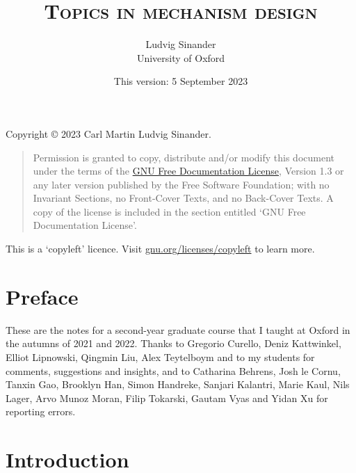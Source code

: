 \documentclass[11pt,letterpaper,reqno,oneside]{book}
\title{\scshape Topics in mechanism design}
\author{Ludvig Sinander \\
University of Oxford}
\date{\small This version: 5 September 2023}
\begin{document}
\maketitle

\pagebreak
\hspace{1pt}\vfill
\noindent
Copyright \copyright{} 2023 Carl Martin Ludvig Sinander.

\begin{quotation}
\noindent
Permission is granted to copy, distribute and/or modify this document under the terms of the \href{https://www.gnu.org/licenses/fdl}{GNU Free Documentation License}, Version 1.3 or any later version published by the Free Software Foundation; with no Invariant Sections, no Front-Cover Texts, and no Back-Cover Texts. A copy of the license is included in the section entitled `GNU
Free Documentation License'.
\end{quotation}

\noindent
This is a `copyleft' licence.
Visit \href{https://www.gnu.org/licenses/copyleft}{gnu.org/licenses/copyleft} to learn more.



\chapter*{Preface}
\label{preface}

These are the notes for a second-year graduate course that I taught at Oxford in the autumns of 2021 and 2022.
Thanks to Gregorio Curello, Deniz Kattwinkel, Elliot Lipnowski, Qingmin Liu, Alex Teytelboym and to my students for comments, suggestions and insights,
and to Catharina Behrens, Josh le Cornu, Tanxin Gao, Brooklyn Han, Simon Handreke, Sanjari Kalantri, Marie Kaul, Nils Lager, Arvo Munoz Moran, Filip Tokarski, Gautam Vyas and Yidan Xu for reporting errors.



\pagebreak
{}
\setcounter{tocdepth}{1}
\tableofcontents
{}



\setcounter{chapter}{-1}
\chapter{Introduction}
\label{ch0}
\end{document}

